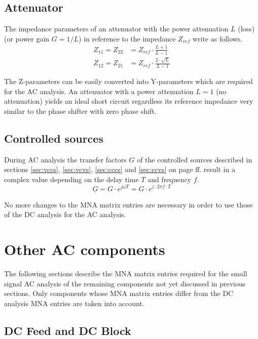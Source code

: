 \subsection{Attenuator}

The impedance parameters of an attenuator with the power attenuation
$L$ (loss) (or power gain $G=1/L$) in reference to the impedance
$Z_{ref}$ write as follows.
\begin{align}
Z_{11} = Z_{22} &= Z_{ref}\cdot\frac{L+1}{L-1}\\
Z_{12} = Z_{21} &= Z_{ref}\cdot\frac{2\cdot\sqrt{L}}{L-1}
\end{align}

The Z-parameters can be easily converted into Y-parameters which are
required for the AC analysis.  An attenuator with a power attenuation
$L=1$ (no attenuation) yields an ideal short circuit regardless its
reference impedance very similar to the phase shifter with zero phase
shift.

\subsection{Controlled sources}

During AC analysis the transfer factors $G$ of the controlled sources
described in sections \ref{sec:vccs}, \ref{sec:vcvs}, \ref{sec:cccs}
and \ref{sec:ccvs} on page \pageref{sec:vccs} ff. result in a complex
value depending on the delay time $T$ and frequency $f$.
\begin{equation}
\underline{G} = G\cdot e^{j\omega T} = G\cdot e^{j\cdot 2\pi f\cdot T}
\end{equation}

No more changes to the MNA matrix entries are necessary in order to
use those of the DC analysis for the AC analysis.

\section{Other AC components}

The following sections describe the MNA matrix entries required for
the small signal AC analysis of the remaining components not yet
discussed in previous sections.  Only components whose MNA matrix
entries differ from the DC analysis MNA entries are taken into
account.

\subsection{DC Feed and DC Block}

